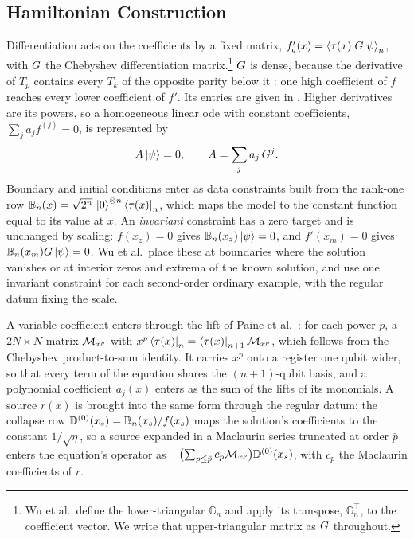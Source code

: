 \subsection{Hamiltonian Construction}
\label{sec:pihm-residual}

Differentiation acts on the coefficients by a fixed matrix, $f_q'(x)=\braket{\tau(x)|G|\psi}_n$, with $G$ the Chebyshev differentiation matrix.\footnote{Wu et al.\ define the lower-triangular $\mathbb{G}_n$ and apply its transpose, $\mathbb{G}_n^{\top}$, to the coefficient vector. We write that upper-triangular matrix as $G$ throughout.} $G$ is dense, because the derivative of $T_p$ contains every $T_k$ of the opposite parity below it \cite{olver2013}: one high coefficient of $f$ reaches every lower coefficient of $f'$. Its entries are given in . Higher derivatives are its powers, so a homogeneous linear \gls{ode} with constant coefficients, $\sum_j a_jf^{(j)}=0$, is represented by
\begin{equation}
    A\ket{\psi}=0, \qquad A=\sum_{j}a_j\,G^{j}.
    \label{eq:pihm-A}
\end{equation}
Boundary and initial conditions enter as data constraints built from the rank-one row $\mathbb{B}_n(x)=\sqrt{2^n}\,\ket{0}^{\otimes n}\bra{\tau(x)}_n$, which maps the model to the constant function equal to its value at $x$. An \emph{invariant} constraint has a zero target and is unchanged by scaling: $f(x_z)=0$ gives $\mathbb{B}_n(x_z)\ket{\psi}=0$, and $f'(x_m)=0$ gives $\mathbb{B}_n(x_m)G\ket{\psi}=0$. Wu et al.\ place these at boundaries where the solution vanishes or at interior zeros and extrema of the known solution, and use one invariant constraint for each second-order ordinary example, with the regular datum fixing the scale.

A variable coefficient enters through the lift of Paine et al.\ \cite{paine2023physicsinformed}: for each power $p$, a $2N\times N$ matrix $\mathcal{M}_{x^p}$ with $x^p\bra{\tau(x)}_n=\bra{\tau(x)}_{n+1}\mathcal{M}_{x^p}$, which follows from the Chebyshev product-to-sum identity. It carries $x^p$ onto a register one qubit wider, so that every term of the equation shares the $(n+1)$-qubit basis, and a polynomial coefficient $a_j(x)$ enters as the sum of the lifts of its monomials. A source $r(x)$ is brought into the same form through the regular datum: the collapse row $\mathbb{D}^{(0)}(x_s)=\mathbb{B}_n(x_s)/f(x_s)$ maps the solution's coefficients to the constant $1/\sqrt{\eta}$, so a source expanded in a Maclaurin series truncated at order $\bar p$ enters the equation's operator as $-\bigl(\sum_{p\le\bar p}c_p\mathcal{M}_{x^p}\bigr)\mathbb{D}^{(0)}(x_s)$, with $c_p$ the Maclaurin coefficients of $r$.

